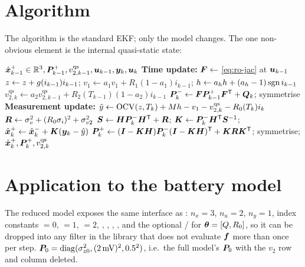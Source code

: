 \section{Algorithm}
The algorithm is the standard EKF; only the model changes.  The one
non-obvious element is the internal quasi-static state:

\begin{algorithm}[H]
\caption{ReducedOrder-EKF --- one sampling period}
\begin{algorithmic}[1]
\Require $\hat{\bm{x}}^{+}_{k-1}\in\mathbb{R}^3,\bm{P}^{+}_{k-1},v^{\mathrm{qs}}_{2,k-1},\bm{u}_{k-1},\bm{y}_k,\bm{u}_k$
\State \textbf{Time update:} $\bm{F}\gets$ \eqref{eq:ro-jac} at $\bm{u}_{k-1}$
\State $z\gets z+g(i_{k-1})i_{k-1}$;\;
       $v_1\gets a_1v_1+R_1(1-a_1)i_{k-1}$;\;
       $h\gets a_hh+(a_h-1)\operatorname{sgn} i_{k-1}$
\State $v^{\mathrm{qs}}_{2,k}\gets a_2 v^{\mathrm{qs}}_{2,k-1}+R_2(T_{k-1})(1-a_2)i_{k-1}$
\State $\bm{P}^{-}_k\gets\bm{F}\bm{P}^{+}_{k-1}\bm{F}^{\mathsf{T}}+\bm{Q}_k$; symmetrise
\State \textbf{Measurement update:}
  $\hat{y}\gets\mathrm{OCV}(z,T_k)+Mh-v_1-v^{\mathrm{qs}}_{2,k}-R_0(T_k)i_k$
\State $\bm{R}\gets\sigma_v^2+(R_0\sigma_i)^2+\sigma_{v2}^2$ 
\State $\bm{S}\gets\bm{H}\bm{P}^{-}_k\bm{H}^{\mathsf{T}}+\bm{R}$;\;
  $\bm{K}\gets\bm{P}^{-}_k\bm{H}^{\mathsf{T}}\bm{S}^{-1}$;\;
  $\hat{\bm{x}}^{+}_k\gets\hat{\bm{x}}^{-}_k+\bm{K}(\bm{y}_k-\hat{y})$
\State $\bm{P}^{+}_k\gets(\bm{I}-\bm{K}\bm{H})\bm{P}^{-}_k(\bm{I}-\bm{K}\bm{H})^{\mathsf{T}}+\bm{K}\bm{R}\bm{K}^{\mathsf{T}}$; symmetrise; 
\Ensure $\hat{\bm{x}}^{+}_k,\bm{P}^{+}_k,v^{\mathrm{qs}}_{2,k}$
\end{algorithmic}
\end{algorithm}

\section{Application to the battery model}
The reduced model exposes the same interface as : $n_x=3$, $n_u=2$, $n_y=1$, index
constants $=0$, $=1$, $=2$, , , ,
, and the optional / for
$\bm{\theta}=[Q,R_0]$, so it can be dropped into any filter in the library that does not evaluate
$\bm{f}$ more than once per step.  $\bm{P}_0=\operatorname{diag}(\sigma_{z0}^2,(2\,\text{mV})^2,0.5^2)$, i.e.\ the full
model's $\bm{P}_0$ with the $v_2$ row and column deleted.

